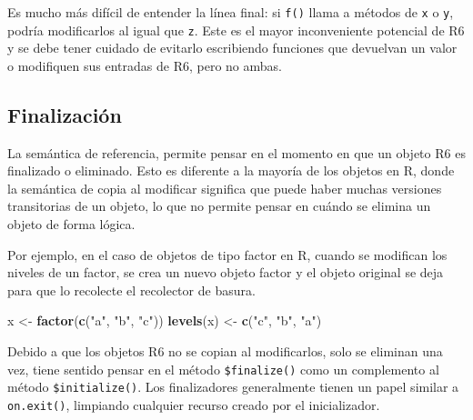 \documentclass[
]{book}
\newenvironment{Shaded}{\begin{snugshade}}{\end{snugshade}}
\newcommand{\AttributeTok}[1]{\textcolor[rgb]{0.13,0.29,0.53}{#1}}
\newcommand{\ConstantTok}[1]{\textcolor[rgb]{0.56,0.35,0.01}{#1}}
\newcommand{\ControlFlowTok}[1]{\textcolor[rgb]{0.13,0.29,0.53}{\textbf{#1}}}
\newcommand{\FunctionTok}[1]{\textcolor[rgb]{0.13,0.29,0.53}{\textbf{#1}}}
\newcommand{\NormalTok}[1]{#1}
\newcommand{\OtherTok}[1]{\textcolor[rgb]{0.56,0.35,0.01}{#1}}
\newcommand{\SpecialCharTok}[1]{\textcolor[rgb]{0.81,0.36,0.00}{\textbf{#1}}}
\newcommand{\StringTok}[1]{\textcolor[rgb]{0.31,0.60,0.02}{#1}}
\begin{document}
Es mucho más difícil de entender la línea final: si \texttt{f()} llama a métodos de \texttt{x} o \texttt{y}, podría modificarlos al igual que \texttt{z}. Este es el mayor inconveniente potencial de R6 y se debe tener cuidado de evitarlo escribiendo funciones que devuelvan un valor o modifiquen sus entradas de R6, pero no ambas.

\hypertarget{finalizaciuxf3n}{%
\subsection{Finalización}\label{finalizaciuxf3n}}

La semántica de referencia, permite pensar en el momento en que un objeto R6 es finalizado o eliminado. Esto es diferente a la mayoría de los objetos en R, donde la semántica de copia al modificar significa que puede haber muchas versiones transitorias de un objeto, lo que no permite pensar en cuándo se elimina un objeto de forma lógica.

Por ejemplo, en el caso de objetos de tipo factor en R, cuando se modifican los niveles de un factor, se crea un nuevo objeto factor y el objeto original se deja para que lo recolecte el recolector de basura.

\begin{Shaded}
\begin{Highlighting}[]
\NormalTok{x }\OtherTok{\textless{}{-}} \FunctionTok{factor}\NormalTok{(}\FunctionTok{c}\NormalTok{(}\StringTok{"a"}\NormalTok{, }\StringTok{"b"}\NormalTok{, }\StringTok{"c"}\NormalTok{))}
\FunctionTok{levels}\NormalTok{(x) }\OtherTok{\textless{}{-}} \FunctionTok{c}\NormalTok{(}\StringTok{"c"}\NormalTok{, }\StringTok{"b"}\NormalTok{, }\StringTok{"a"}\NormalTok{)}
\end{Highlighting}
\end{Shaded}

Debido a que los objetos R6 no se copian al modificarlos, solo se eliminan una vez, tiene sentido pensar en el método \texttt{\$finalize()} como un complemento al método \texttt{\$initialize()}. Los finalizadores generalmente tienen un papel similar a \texttt{on.exit()}, limpiando cualquier recurso creado por el inicializador.

\begin{Shaded}
\end{Shaded}
\end{document}
